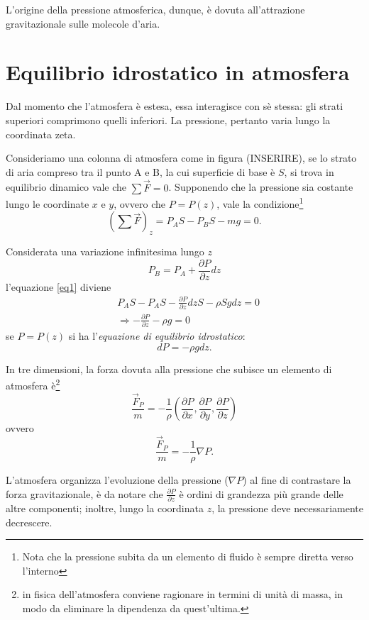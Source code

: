 L'origine della pressione atmosferica, dunque, è dovuta all'attrazione gravitazionale sulle molecole d'aria. 
\section{Equilibrio idrostatico in atmosfera}
Dal momento che l'atmosfera è estesa, essa interagisce con sè stessa: gli strati superiori comprimono quelli inferiori. La pressione, pertanto varia lungo la coordinata zeta. 

Consideriamo una colonna di atmosfera come in figura (INSERIRE), se lo strato di aria compreso tra il punto A e B, la cui superficie di base è $S$, si trova in equilibrio dinamico vale che $\sum\vec{F}=0$. Supponendo che la pressione sia costante lungo le coordinate $x$ e $y$, ovvero che $P=P(z)$, vale la condizione\footnote{Nota che la pressione subita da un elemento di fluido è sempre diretta verso l'interno}
\begin{equation}\label{eq1}
	(\sum\vec{F})_z=P_A S - P_B S -mg =0.
\end{equation}

Considerata una variazione infinitesima lungo $z$ 
\begin{equation}
	P_B=P_A+\frac{\partial P}{\partial z}dz
\end{equation}
l'equazione \eqref{eq1} diviene
\begin{align}
	&P_A S - P_A S -\frac{\partial P}{\partial z}dzS -\rho S g dz=0\\
	&\Rightarrow -\frac{\partial P}{\partial z}-\rho g =0
\end{align}
se $P=P(z)$ si ha l'\emph{equazione di equilibrio idrostatico}:
\begin{equation}\label{idro}
	\boxed{dP=-\rho g dz}.
\end{equation}

In tre dimensioni, la forza dovuta alla pressione che subisce un elemento di atmosfera è\footnote{in fisica dell'atmosfera conviene ragionare in termini di unità di massa, in modo da eliminare la dipendenza da quest'ultima.}
\begin{equation}
	\frac{\vec{F}_P}{m}=-\frac{1}{\rho}\left(\frac{\partial P}{\partial x},\frac{\partial P}{\partial y}, \frac{\partial P}{\partial z}\right)
\end{equation}
ovvero
\begin{equation}
	\frac{\vec{F}_P}{m}=-\frac{1}{\rho}\nabla P.
\end{equation}

L'atmosfera organizza l'evoluzione della pressione ($\nabla P$) al fine di contrastare la forza gravitazionale, è da notare che $\frac{\partial P}{\partial z}$ è ordini di grandezza più grande delle altre componenti; inoltre, lungo la coordinata $z$, la pressione deve necessariamente decrescere. 


